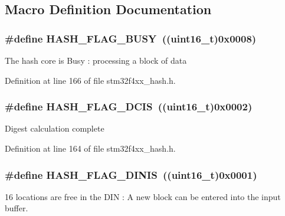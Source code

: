 \subsection{Macro Definition Documentation}
\hypertarget{group___h_a_s_h__flags__definition_ga7638e6048806f6ba361f162db23c2a53}{
\subsubsection[{H\-A\-S\-H\-\_\-\-F\-L\-A\-G\-\_\-\-B\-U\-S\-Y}]{\setlength{\rightskip}{0pt plus 5cm}\#define H\-A\-S\-H\-\_\-\-F\-L\-A\-G\-\_\-\-B\-U\-S\-Y~((uint16\-\_\-t)0x0008)}}\label{group___h_a_s_h__flags__definition_ga7638e6048806f6ba361f162db23c2a53}
The hash core is Busy \-: processing a block of data 

Definition at line 166 of file stm32f4xx\-\_\-hash.\-h.

\hypertarget{group___h_a_s_h__flags__definition_ga030c3298c0c54a79e5360e216bc257df}{
\subsubsection[{H\-A\-S\-H\-\_\-\-F\-L\-A\-G\-\_\-\-D\-C\-I\-S}]{\setlength{\rightskip}{0pt plus 5cm}\#define H\-A\-S\-H\-\_\-\-F\-L\-A\-G\-\_\-\-D\-C\-I\-S~((uint16\-\_\-t)0x0002)}}\label{group___h_a_s_h__flags__definition_ga030c3298c0c54a79e5360e216bc257df}
Digest calculation complete 

Definition at line 164 of file stm32f4xx\-\_\-hash.\-h.

\hypertarget{group___h_a_s_h__flags__definition_ga0f63115b39daba0d413c79f324923dd7}{
\subsubsection[{H\-A\-S\-H\-\_\-\-F\-L\-A\-G\-\_\-\-D\-I\-N\-I\-S}]{\setlength{\rightskip}{0pt plus 5cm}\#define H\-A\-S\-H\-\_\-\-F\-L\-A\-G\-\_\-\-D\-I\-N\-I\-S~((uint16\-\_\-t)0x0001)}}\label{group___h_a_s_h__flags__definition_ga0f63115b39daba0d413c79f324923dd7}
16 locations are free in the D\-I\-N \-: A new block can be entered into the input buffer. 

